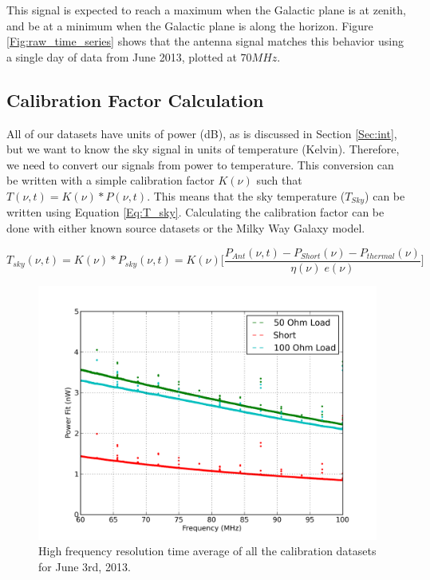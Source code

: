 This signal is expected to reach a maximum when the Galactic plane is at zenith, and be at a minimum when the Galactic plane is along the horizon. Figure \ref{Fig:raw_time_series} shows that the antenna signal matches this behavior using a single day of data from June 2013, plotted at $70 MHz$. 


\subsection{Calibration Factor Calculation}

All of our datasets have units of power (dB), as is discussed in Section \ref{Sec:int}, but we want to know the sky signal in units of temperature (Kelvin). Therefore, we need to convert our signals from power to temperature. This conversion can be written with a simple calibration factor $K(\nu)$ such that $T(\nu,t) = K(\nu)*P(\nu,t)$. This means that the sky temperature ($T_{Sky}$) can be written using Equation \ref{Eq:T_sky}. Calculating the calibration factor can be done with either known source datasets or the Milky Way Galaxy model. 

\begin{equation} \label{Eq:T_sky}
T_{sky} (\nu, t) = K(\nu)* P_{sky}(\nu,t) = K (\nu) \Big[ \frac{P_{Ant}(\nu,t) - P_{Short} (\nu) - P_{thermal} (\nu)}{\eta (\nu) \; e (\nu) } \Big]
\end{equation}

\begin{figure}[htb]
\centering
\includegraphics[width=0.85\linewidth]{Data_analysis/figures/June_03_mean_uncal_ref_spectrum_data.png}
\caption{High frequency resolution time average of all the calibration datasets for June 3rd, 2013.}
\label{Fig:avg_cal}
\end{figure}

